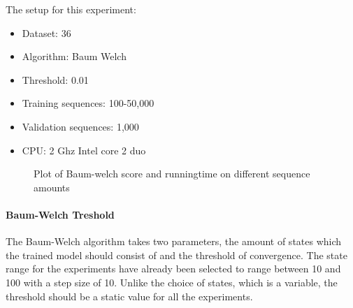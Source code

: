 The setup for this experiment:
\begin{itemize}
\item Dataset: 36
\item Algorithm: Baum Welch
\item Threshold: 0.01
\item Training sequences: 100-50,000
\item Validation sequences: 1,000
\item CPU: 2 Ghz Intel core 2 duo
\end{itemize}

\begin{figure}
	\centering
	\begin{subfigure}[b]{0.5\textwidth}
        \end{subfigure}%
		\begin{subfigure}[b]{0.5\textwidth}
	\end{subfigure}
  	\caption{Plot of Baum-welch score and runningtime on different sequence amounts}\label{fig:sequences}
\end{figure}


\paragraph{Baum-Welch Treshold}
The Baum-Welch algorithm takes two parameters, the amount of states which the trained model should consist of and the threshold of convergence. The state range for the experiments have already been selected to range between 10 and 100 with a step size of 10. Unlike the choice of states, which is a variable, the threshold should be a static value for all the experiments.

